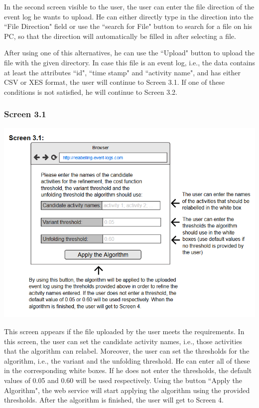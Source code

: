 \documentclass[notitlepage]{article}
\begin{document}
\begin{flushleft}
In the second screen visible to the user, the user can enter the file direction of the event log he wants to upload. He can either directly type in the direction into the ``File Direction" field or use the ``search for File" button to search for a file on his PC, so that the direction will automatically be filled in after selecting a file.

After using one of this alternatives, he can use the ``Upload" button to upload the file with the given directory. In case this file is an event log, i.e., the data contains at least the attributes ``id", ``time stamp" and ``activity name", and has either CSV or XES format, the user will continue to Screen 3.1. If one of these conditions is not satisfied, he will continue to Screen 3.2. 


\subsubsection{Screen 3.1}
\includegraphics[scale=0.9]{InterfaceMockup3-1.png}

This screen appears if the file uploaded by the user meets the requirements. In this screen, the user can set the candidate activity names, i.e., those activities that the algorithm can relabel. Moreover, the user can set the thresholds for the algorithm, i.e., the variant and the unfolding threshold. He can enter all of these in the corresponding white boxes. If he does not enter the thresholds, the default values of 0.05 and 0.60 will be used respectively. Using the button ``Apply the Algorithm", the web service will start applying the algorithm using the provided thresholds. After the algorithm is finished, the user will get to Screen 4.


\end{flushleft}
\end{document}

